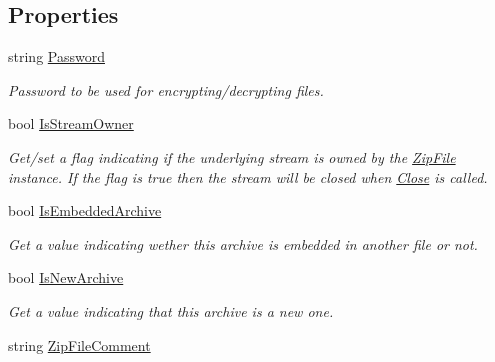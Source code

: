 \subsection*{Properties}
\begin{DoxyCompactItemize}
\item 
string \hyperlink{class_i_c_sharp_code_1_1_sharp_zip_lib_1_1_zip_1_1_zip_file_ab6e0c0c41e4782d4b7342eaf40a8bd7b}{Password}
\begin{DoxyCompactList}\small\item\em Password to be used for encrypting/decrypting files. \end{DoxyCompactList}\item 
bool \hyperlink{class_i_c_sharp_code_1_1_sharp_zip_lib_1_1_zip_1_1_zip_file_a12922b0e2e600c62cfe743aba809ff7c}{Is\+Stream\+Owner}
\begin{DoxyCompactList}\small\item\em Get/set a flag indicating if the underlying stream is owned by the \hyperlink{class_i_c_sharp_code_1_1_sharp_zip_lib_1_1_zip_1_1_zip_file}{Zip\+File} instance. If the flag is true then the stream will be closed when \hyperlink{class_i_c_sharp_code_1_1_sharp_zip_lib_1_1_zip_1_1_zip_file_aeb7e59b277d058f45aa417cb07b4b1d3}{Close} is called. \end{DoxyCompactList}\item 
bool \hyperlink{class_i_c_sharp_code_1_1_sharp_zip_lib_1_1_zip_1_1_zip_file_a9cd63e1f692cd20f8b42688fbe20ff08}{Is\+Embedded\+Archive}
\begin{DoxyCompactList}\small\item\em Get a value indicating wether this archive is embedded in another file or not. \end{DoxyCompactList}\item 
bool \hyperlink{class_i_c_sharp_code_1_1_sharp_zip_lib_1_1_zip_1_1_zip_file_acf2ecbfaf81fb0ee9e5051118fd592cc}{Is\+New\+Archive}
\begin{DoxyCompactList}\small\item\em Get a value indicating that this archive is a new one. \end{DoxyCompactList}\item 
string \hyperlink{class_i_c_sharp_code_1_1_sharp_zip_lib_1_1_zip_1_1_zip_file_a79f322552fbac44c4209b8e0d954b2f3}{Zip\+File\+Comment}

\end{DoxyCompactItemize}
